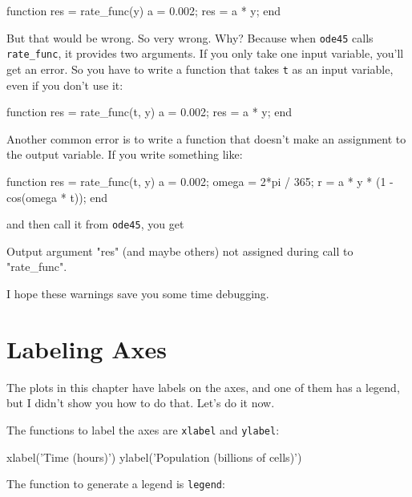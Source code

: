 \begin{code}
function res = rate_func(y)        %
    a = 0.002;
    res = a * y;
end
\end{code}

But that would be wrong.  So very wrong.  Why?  Because
when \lstinline{ode45} calls \lstinline{rate_func}, it provides two arguments.
If you only take one input variable, you'll get an error.  So
you have to write a function that takes \lstinline{t} as an input
variable, even if you don't use it:


\begin{code}
function res = rate_func(t, y)     %
    a = 0.002;
    res = a * y;
end
\end{code}

Another common error is to write a function that doesn't make
an assignment to the output variable.  If you write something
like:

\begin{code}
function res = rate_func(t, y)
    a = 0.002;
    omega = 2*pi / 365;
    r = a * y * (1 - cos(omega * t));    %
end
\end{code}
 and then call it from \lstinline{ode45}, you get

\begin{code}
Output argument "res" (and maybe others) not assigned during call
to "rate_func".
\end{code}

I hope these warnings save you some time debugging.

\section{Labeling Axes}

The plots in this chapter have labels on the axes, and one of them has a legend, but I didn't show you how to do that.  Let's do it now.


The functions to label the axes are \lstinline{xlabel} and \lstinline{ylabel}:

\begin{code}
xlabel('Time (hours)')
ylabel('Population (billions of cells)')
\end{code}

The function to generate a legend is \lstinline{legend}:

